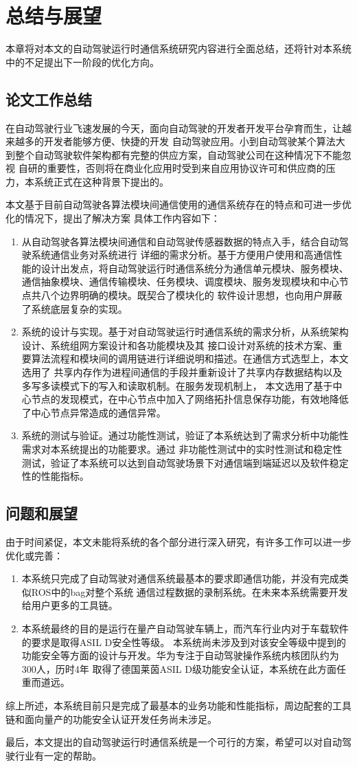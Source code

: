 \chapter{总结与展望}
本章将对本文的自动驾驶运行时通信系统研究内容进行全面总结，还将针对本系统中的不足提出下一阶段的优化方向。
\section{论文工作总结}
在自动驾驶行业飞速发展的今天，面向自动驾驶的开发者开发平台孕育而生，让越来越多的开发者能够方便、快捷的开发
自动驾驶应用。小到自动驾驶某个算法大到整个自动驾驶软件架构都有完整的供应方案，自动驾驶公司在这种情况下不能忽视
自研的重要性，否则将在商业化应用时受到来自应用协议许可和供应商的压力，本系统正式在这种背景下提出的。

本文基于目前自动驾驶各算法模块间通信使用的通信系统存在的特点和可进一步优化的情况下，提出了解决方案
具体工作内容如下：
\begin{enumerate}
    \item 从自动驾驶各算法模块间通信和自动驾驶传感器数据的特点入手，结合自动驾驶系统通信业务对系统进行
    详细的需求分析。基于方便用户使用和高通信性能的设计出发点，将自动驾驶运行时通信系统分为通信单元模块、服务模块、
    通信抽象模块、通信传输模块、任务模块、调度模块、服务发现模块和中心节点共八个边界明确的模块。既契合了模块化的
    软件设计思想，也向用户屏蔽了系统底层复杂的实现。
    \item 系统的设计与实现。基于对自动驾驶运行时通信系统的需求分析，从系统架构设计、系统组网方案设计和各功能模块及其
    接口设计对系统的技术方案、重要算法流程和模块间的调用链进行详细说明和描述。在通信方式选型上，本文选用了
    共享内存作为进程间通信的手段并重新设计了共享内存数据结构以及多写多读模式下的写入和读取机制。在服务发现机制上，
    本文选用了基于中心节点的发现模式，在中心节点中加入了网络拓扑信息保存功能，有效地降低了中心节点异常造成的通信异常。
    \item 系统的测试与验证。通过功能性测试，验证了本系统达到了需求分析中功能性需求对本系统提出的功能要求。通过
    非功能性测试中的实时性测试和稳定性测试，验证了本系统可以达到自动驾驶场景下对通信端到端延迟以及软件稳定性的性能指标。
\end{enumerate}

\section{问题和展望}
由于时间紧促，本文未能将系统的各个部分进行深入研究，有许多工作可以进一步优化或完善：
\begin{enumerate}
    \item 本系统只完成了自动驾驶对通信系统最基本的要求即通信功能，并没有完成类似ROS中的bag对整个系统
    通信过程数据的录制系统。在未来本系统需要开发给用户更多的工具链。
    \item 本系统最终的目的是运行在量产自动驾驶车辆上，而汽车行业内对于车载软件的要求是取得ASIL D安全性等级。
    本系统尚未涉及到对该安全等级中提到的功能安全等方面的设计与开发。华为专注于自动驾驶操作系统内核团队约为300人，历时4年
    取得了德国莱茵ASIL D级功能安全认证，本系统在此方面任重而道远。
\end{enumerate}

综上所述，本系统目前只是完成了最基本的业务功能和性能指标，周边配套的工具链和面向量产的功能安全认证开发任务尚未涉足。

最后，本文提出的自动驾驶运行时通信系统是一个可行的方案，希望可以对自动驾驶行业有一定的帮助。


